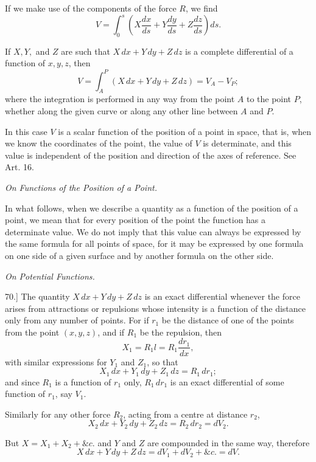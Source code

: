 \documentclass[11pt,a4paper]{article}
\begin{document}
If we make use of the components of the force \(R\), we find
\[
V=\int_0^s\left(X\frac{dx}{ds}+Y\frac{dy}{ds}+Z\frac{dz}{ds}\right)ds.
\]

If \(X,Y,\) and \(Z\) are such that \(X\,dx+Y\,dy+Z\,dz\) is a complete
differential of a function of \(x,y,z\), then
\[
V=\int_A^P (X\,dx+Y\,dy+Z\,dz)=V_A-V_P;
\]
where the integration is performed in any way from the point \(A\) to
the point \(P\), whether along the given curve or along any other line
between \(A\) and \(P\).

In this case \(V\) is a scalar function of the position of a point in
space, that is, when we know the coordinates of the point, the value of
\(V\) is determinate, and this value is independent of the position and
direction of the axes of reference. See Art. 16.

\begin{center}
\textit{On Functions of the Position of a Point.}
\end{center}

In what follows, when we describe a quantity as a function of the
position of a point, we mean that for every position of the point the
function has a determinate value. We do not imply that this value can
always be expressed by the same formula for all points of space, for it
may be expressed by one formula on one side of a given surface and by
another formula on the other side.

\clearpage
\setcounter{footnote}{0}

\begin{center}
\textit{On Potential Functions.}
\end{center}

70.] The quantity \(X\,dx+Y\,dy+Z\,dz\) is an exact differential whenever
the force arises from attractions or repulsions whose intensity is a
function of the distance only from any number of points. For if \(r_1\)
be the distance of one of the points from the point \((x,y,z)\), and if
\(R_1\) be the repulsion, then
\[
X_1=R_1 l=R_1\frac{dr_1}{dx},
\]
with similar expressions for \(Y_1\) and \(Z_1\), so that
\[
X_1\,dx+Y_1\,dy+Z_1\,dz=R_1\,dr_1;
\]
and since \(R_1\) is a function of \(r_1\) only, \(R_1\,dr_1\) is an
exact differential of some function of \(r_1\), say \(V_1\).

Similarly for any other force \(R_2\), acting from a centre at distance
\(r_2\),
\[
X_2\,dx+Y_2\,dy+Z_2\,dz=R_2\,dr_2=dV_2.
\]

But \(X=X_1+X_2+\&c.\) and \(Y\) and \(Z\) are compounded in the same
way, therefore
\[
X\,dx+Y\,dy+Z\,dz=dV_1+dV_2+\&c.=dV.
\]
\end{document}
